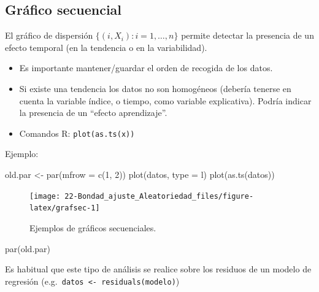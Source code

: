 \documentclass[
]{book}
\newenvironment{Shaded}{\begin{snugshade}}{\end{snugshade}}
\newcommand{\AttributeTok}[1]{\textcolor[rgb]{0.77,0.63,0.00}{#1}}
\newcommand{\DecValTok}[1]{\textcolor[rgb]{0.00,0.00,0.81}{#1}}
\newcommand{\FunctionTok}[1]{\textcolor[rgb]{0.00,0.00,0.00}{#1}}
\newcommand{\NormalTok}[1]{#1}
\newcommand{\OtherTok}[1]{\textcolor[rgb]{0.56,0.35,0.01}{#1}}
\newcommand{\StringTok}[1]{\textcolor[rgb]{0.31,0.60,0.02}{#1}}
\theoremstyle{break}
\theoremstyle{nonumberplain}
\begin{document}
\hypertarget{gruxe1fico-secuencial}{%
\subsection{Gráfico secuencial}\label{gruxe1fico-secuencial}}

El gráfico de dispersión \(\{(i,X_{i}) : i = 1, \ldots, n \}\) permite detectar la presencia de un efecto temporal (en la tendencia o en la variabilidad).

\begin{itemize}
\item
  Es importante mantener/guardar el orden de recogida de los datos.
\item
  Si existe una tendencia los datos no son homogéneos (debería tenerse
  en cuenta la variable índice, o tiempo, como variable explicativa).
  Podría indicar la presencia de un ``efecto aprendizaje''.
\item
  Comandos R: \texttt{plot(as.ts(x))}
\end{itemize}

Ejemplo:

\begin{Shaded}
\begin{Highlighting}[]
\NormalTok{old.par }\OtherTok{\textless{}{-}} \FunctionTok{par}\NormalTok{(}\AttributeTok{mfrow =} \FunctionTok{c}\NormalTok{(}\DecValTok{1}\NormalTok{, }\DecValTok{2}\NormalTok{))}
\FunctionTok{plot}\NormalTok{(datos, }\AttributeTok{type =} \StringTok{\textquotesingle{}l\textquotesingle{}}\NormalTok{)}
\FunctionTok{plot}\NormalTok{(}\FunctionTok{as.ts}\NormalTok{(datos))}
\end{Highlighting}
\end{Shaded}

\begin{figure}[!htb]

{\centering \texttt{[image: 22-Bondad\_ajuste\_Aleatoriedad\_files/figure-latex/grafsec-1]} 

}

\caption{Ejemplos de gráficos secuenciales.}\label{fig:grafsec}
\end{figure}

\begin{Shaded}
\begin{Highlighting}[]
\FunctionTok{par}\NormalTok{(old.par)}
\end{Highlighting}
\end{Shaded}

Es habitual que este tipo de análisis se realice sobre los residuos
de un modelo de regresión (e.g.~\texttt{datos\ \textless{}-\ residuals(modelo)})
\end{document}
